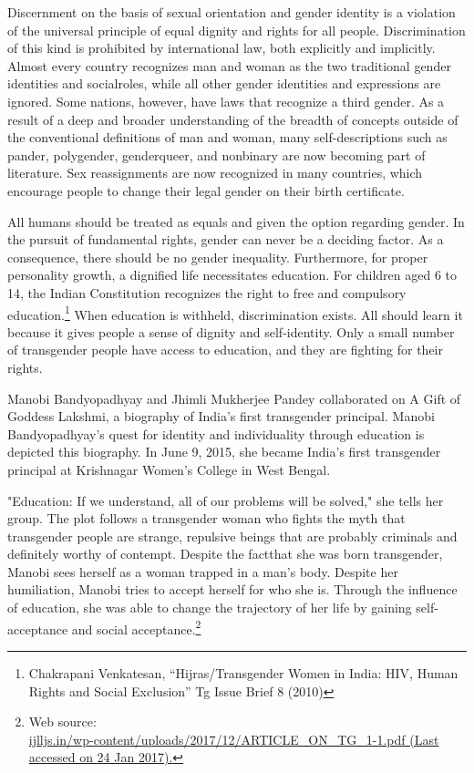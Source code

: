 \begin{multicols}{2}
\noi
Discernment on the basis of sexual orientation and gender identity is a violation of the universal
principle of equal dignity and rights for all people. Discrimination of this kind is prohibited by
international law, both explicitly and implicitly. Almost every country recognizes man and
woman as the two traditional gender identities and socialroles, while all other gender identities
and expressions are ignored. Some nations, however, have laws that recognize a third gender.
As a result of a deep and broader understanding of the breadth of concepts outside of the
conventional definitions of man and woman, many self-descriptions such as pander,
polygender, genderqueer, and nonbinary are now becoming part of literature. Sex
reassignments are now recognized in many countries, which encourage people to change their
legal gender on their birth certificate.

\vspace{-.15cm}


\vspace{-.15cm}

\noi
All humans should be treated as equals and given the option regarding gender. In the pursuit
of fundamental rights, gender can never be a deciding factor. As a consequence, there should
be no gender inequality. Furthermore, for proper personality growth, a dignified life
necessitates education. For children aged 6 to 14, the Indian Constitution recognizes the right to free and compulsory education.\footnote{Chakrapani Venkatesan, “Hijras/Transgender Women in India: HIV, Human Rights and Social Exclusion” Tg Issue Brief 8 (2010)} When education is withheld, discrimination exists. All should learn it because it gives people a sense of dignity and self-identity. Only a small number of transgender people have access to education, and they are fighting for their rights.

\noi
Manobi Bandyopadhyay and Jhimli Mukherjee Pandey collaborated on A Gift of Goddess
Lakshmi, a biography of India's first transgender principal. Manobi Bandyopadhyay's quest for
identity and individuality through education is depicted this biography. In June 9, 2015, she
became India's first transgender principal at Krishnagar Women's College in West Bengal.

\noi
"Education: If we understand, all of our problems will be solved," she tells her group. The plot
follows a transgender woman who fights the myth that transgender people are strange, repulsive
beings that are probably criminals and definitely worthy of contempt. Despite the factthat she
was born transgender, Manobi sees herself as a woman trapped in a man's body. Despite her
humiliation, Manobi tries to accept herself for who she is. Through the influence of education,
she was able to change the trajectory of her life by gaining self-acceptance and social
acceptance.\footnote{Web source:\\ \url{ijlljs.in/wp-content/uploads/2017/12/ARTICLE_ON_TG_1-1.pdf (Last accessed on 24 Jan 2017).}}


\end{multicols}
